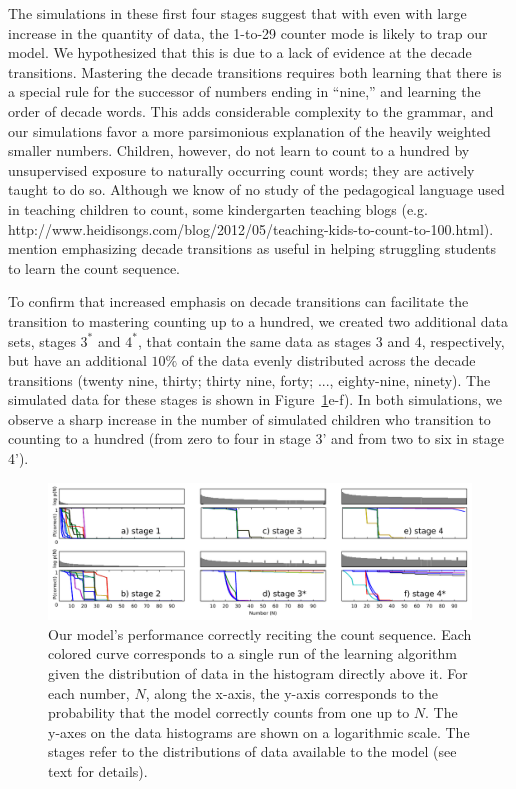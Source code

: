 \documentclass[10pt,letterpaper]{article}
\begin{document}
The simulations in these first four stages suggest that with even with
large increase in the quantity of data, the 1-to-29 counter mode is
likely to trap our model. We hypothesized that this is due to a lack
of evidence at the decade transitions. Mastering the decade
transitions requires both learning that there is a special rule for
the successor of numbers ending in ``nine,'' and learning the order of
decade words. This adds considerable complexity to the grammar, and
our simulations favor a more parsimonious explanation of the heavily
weighted smaller numbers. Children, however, do not learn to count to
a hundred by unsupervised exposure to naturally occurring count words;
they are actively taught to do so. Although we know of no study of the
pedagogical language used in teaching children to count, some kindergarten teaching
blogs (e.g. http://www.heidisongs.com/blog/2012/05/teaching-kids-to-count-to-100.html).
mention emphasizing decade transitions as useful in helping struggling
students to learn the count sequence.

To confirm that increased emphasis on decade transitions can
facilitate the transition to mastering counting up to a hundred, we
created two additional data sets, stages $3^*$ and $4^*$, that contain the
same data as stages 3 and 4, respectively, but have an additional
$10\%$ of the data evenly distributed across the decade transitions
(twenty nine, thirty; thirty nine, forty; ..., eighty-nine,
ninety). The simulated data for these stages is shown in
Figure~\ref{fig:counting_grid}e-f). In both simulations, we observe a
sharp increase in the number of simulated children who transition to
counting to a hundred (from zero to four in stage 3' and from two to
six in stage 4').



\begin{figure}[t]
  \includegraphics[width=\linewidth]{figures/counting_grid2}
  \caption{Our model's performance correctly reciting the count
    sequence. Each colored curve corresponds to a single run of the learning
    algorithm given the distribution of data in the histogram directly
    above it. For each number, $N$, along the x-axis, the y-axis
    corresponds to the probability that the model correctly counts
    from one up to $N$. The y-axes on the data histograms are shown on
    a logarithmic scale. The stages refer to the distributions of data
    available to the model (see text for details).
  }\label{fig:counting_grid}
\end{figure}
\end{document}
